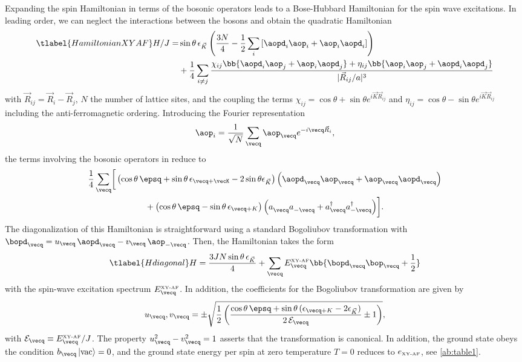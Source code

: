 Expanding the spin Hamiltonian in terms of the bosonic operators leads to a Bose-Hubbard Hamiltonian for the spin wave excitations.
In leading order, we can neglect the interactions between the bosons and obtain the quadratic Hamiltonian
%
\begin{align} \tlabel{HamiltonianXYAF}
H/J = &\sin \theta \, \epsilon_{\vec K} \left(\frac{3 N}{4} - \frac{1}{2}\sum_i\left[\aopd_{i}\aop_i+ \aop_i \aopd_{i}\right]\right) \\
           &+  \frac{1}{4} \sum_{i\ne j} \frac{
    \chi_{i j} \bb{ \aopd_{i} \aop_{j}  + \aop_{i} \aopd_{j} }
  + \eta_{i j} \bb{ \aop_{i} \aop_{j}  + \aopd_{i} \aopd_{j} }
}{|{\vec R}_{ij}/a|^3}
\end{align}
with  ${\vec R}_{ij}={\vec R}_i - {\vec R}_j$,  $N$ the number of lattice sites, and the coupling the terms
$\chi_{i j}=\cos\theta+\sin\theta e^{i {\vec K} {\vec R}_{ij}}$ and $\eta_{i j}=\cos\theta-\sin\theta e^{i {\vec K} {\vec R}_{ij}}$ including the
 anti-ferro\-magnetic ordering.
Introducing the  Fourier representation
\begin{align}
    \aop_i = \frac{1}{\sqrt{N}} \sum_{\vecq} \aop_{\vecq}e^{-i {\vecq} {\vec R}_i},
\end{align}
the terms involving the bosonic operators in  reduce to
%
\begin{align}
    \frac{1}{4} \sum_{\vecq} &\bigg[
\left( \cos\theta \, \epsq +\sin\theta \, \epsilon_{\vecq+\vecK} - 2 \sin \theta \epsilon_{\vec K}\right)\Big(\aopd_{\vecq} \aop_{\vecq}  + \aop_{\vecq} \aopd_{\vecq}\Big) \\
&\qquad\qquad+\left( \cos\theta \, \epsq-\sin\theta \, \epsilon_{\vecq+K} \right)\Big(a^{\phantom\dag}_{\vecq} a^{\phantom\dag}_{-\vecq}
+ a^{\dag}_{\vecq} a^{\dag}_{-{\vecq}} \Big) \bigg].
\end{align}
%
The diagonalization of this Hamiltonian is straightforward using a standard Bogoliubov transformation
with $\bopd_{\vecq} = u_{\vecq}\, \aopd_{\vecq} - v_{\vecq}\, \aop_{-\vecq}$.
Then, the Hamiltonian takes the form
%
\begin{align} \tlabel{Hdiagonal}
H = \frac{3J N \sin \theta\, \epsilon_{\vec K}}{4}  + \sum_{\vecq} E^{\mbox{\tiny XY-AF}}_{\vecq} \bb{\bopd_{\vecq}\bop_{\vecq} + \frac{1}{2}}
\end{align}
%
with the spin-wave excitation spectrum $E^{\mbox{\tiny XY-AF}}_{\vecq}$. In addition, the coefficients  for the Bogoliubov transformation
are given by
%
\begin{align}
u_{\vecq} , v_{\vecq} = \pm\sqrt{\frac{1}{2} \left( \frac{\cos\theta \, \epsq +\sin\theta \, (\epsilon_{\vecq+K} - 2 \epsilon_{\vec K})}{2\, \mathcal{E}_{\vecq}}\pm 1\right)},
\end{align}
%
with $\mathcal{E}_{\vecq} \equiv E^{\mbox{\tiny XY-AF}}_{\vecq} / J $.
The property $u^2_{\vecq}-v^2_{\vecq}=1$ asserts that the transformation is canonical.
In addition, the ground state obeys the condition $b_{\vecq} \left|\text{vac}\right\rangle = 0$, and the ground state energy per spin at zero temperature $T=0$
reduces to $e_{\mbox{\tiny XY-AF}}$, see \cref{ab:table1}.

